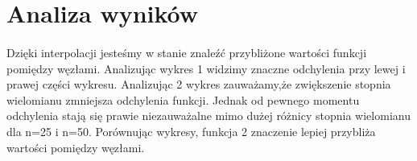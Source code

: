 \documentclass{article}
\begin{document}
\begingroup\centering





\endgroup




\section{Analiza wyników}
\paragraph{}
Dzięki interpolacji jesteśmy w stanie znaleźć przybliżone wartości funkcji pomiędzy węzłami. Analizując wykres 1 widzimy znaczne odchylenia przy lewej i prawej części wykresu.
Analizując 2 wykres zauważamy,że zwiększenie stopnia wielomianu zmniejsza odchylenia funkcji. Jednak od pewnego momentu odchylenia stają się prawie niezauważalne mimo dużej różnicy stopnia wielomianu dla n=25 i n=50.
Porównując wykresy, funkcja 2 znaczenie lepiej przybliża wartości pomiędzy węzłami.



\vfill {}
\end{document}

